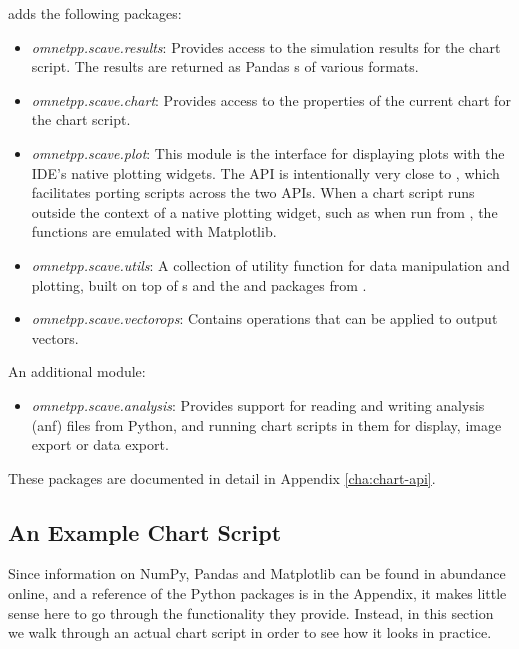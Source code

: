 {\opp} adds the following packages:

\begin{itemize}
  \item \textit{omnetpp.scave.results}: Provides access to the simulation
    results for the chart script. The results are returned as Pandas
    s of various formats.
  \item \textit{omnetpp.scave.chart}: Provides access to the properties of the
    current chart for the chart script.
  \item \textit{omnetpp.scave.plot}: This module is the interface for displaying
    plots with the IDE's native plotting widgets. The API is intentionally very
    close to , which facilitates porting scripts across
    the two APIs. When a chart script runs outside the context of a native
    plotting widget, such as when run from , the functions
    are emulated with Matplotlib.
  \item \textit{omnetpp.scave.utils}: A collection of utility function for data
    manipulation and plotting, built on top of s and the 
    and  packages from .
  \item \textit{omnetpp.scave.vectorops}: Contains operations that can be
    applied to output vectors.
\end{itemize}

An additional module:

\begin{itemize}
  \item \textit{omnetpp.scave.analysis}: Provides support for reading and writing
   analysis (anf) files from Python, and running chart scripts in them for display,
   image export or data export.
\end{itemize}

These packages are documented in detail in Appendix \ref{cha:chart-api}.


\subsection{An Example Chart Script}
\label{sec:ana-sim:example_chart_script}

Since information on NumPy, Pandas and Matplotlib can be found in abundance
online, and a reference of the  Python packages is in the
Appendix, it makes little sense here to go through the functionality they
provide. Instead, in this section we walk through an actual chart script in
order to see how it looks in practice.


